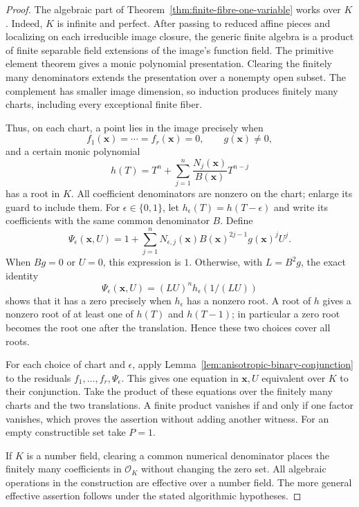 \begin{proof}
The algebraic part of Theorem~\ref{thm:finite-fibre-one-variable} works
over $K$. Indeed, $K$ is infinite and perfect. After passing to reduced
affine pieces and localizing on each irreducible image closure, the
generic finite algebra is a product of finite separable field extensions
of the image's function field. The primitive element theorem gives
a monic polynomial presentation. Clearing the finitely many
denominators extends the presentation over a nonempty open subset.
The complement has smaller image dimension, so induction produces
finitely many charts, including every exceptional finite fiber.

Thus, on each chart, a point lies in the image precisely when
\[
 f_1(\mathbf x)=\cdots=f_r(\mathbf x)=0,
 \qquad g(\mathbf x)\ne0,
\]
and a certain monic polynomial
\[
 h(T)=T^n+\sum_{j=1}^n\frac{N_j(\mathbf x)}{B(\mathbf x)}T^{n-j}
\]
has a root in $K$. All coefficient denominators are nonzero on the
chart; enlarge its guard to include them. For $\epsilon\in\{0,1\}$,
let $h_\epsilon(T)=h(T-\epsilon)$ and write its coefficients with
the same common denominator $B$. Define
\[
 \Psi_\epsilon(\mathbf x,U)
 =1+\sum_{j=1}^n
      N_{\epsilon,j}(\mathbf x)
      B(\mathbf x)^{2j-1}g(\mathbf x)^jU^j.
\]
When $Bg=0$ or $U=0$, this expression is $1$. Otherwise, with
$L=B^2g$, the exact identity
\[
 \Psi_\epsilon(\mathbf x,U)
   =(LU)^n h_\epsilon(1/(LU))
\]
shows that it has a zero precisely when $h_\epsilon$ has a nonzero
root. A root of $h$ gives a nonzero root of at least one of $h(T)$
and $h(T-1)$; in particular a zero root becomes the root one after
the translation. Hence these two choices cover all roots.

For each choice of chart and $\epsilon$, apply
Lemma~\ref{lem:anisotropic-binary-conjunction} to the residuals
$f_1,\ldots,f_r,\Psi_\epsilon$. This gives one equation in
$\mathbf x,U$ equivalent over $K$ to their conjunction. Take the
product of these equations over the finitely many charts and the
two translations. A finite product vanishes if and only if one
factor vanishes, which proves the assertion without adding another
witness. For an empty constructible set take $P=1$.

If $K$ is a number field, clearing a common numerical denominator
places the finitely many coefficients in $\mathcal O_K$ without
changing the zero set. All algebraic operations in the construction
are effective over a number field. The more general effective
assertion follows under the stated algorithmic hypotheses.
\end{proof}


